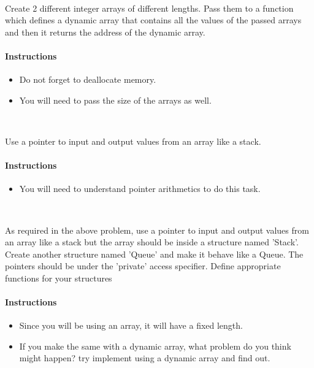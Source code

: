 \documentclass[11pt,fleqn]{book} %
\begin{document}
~\\
\begin{problem}
	Create 2 different integer arrays of different lengths.	Pass them to a function which defines a dynamic array that contains all the values of the passed arrays and then it returns the address of the dynamic array.\\
	\paragraph{Instructions}
	\begin{itemize}
		\item Do not forget to deallocate memory.
		\item You will need to pass the size of the arrays as well.
	\end{itemize}
\end{problem}
~\\
\newpage
\begin{problem}
	Use a pointer to input and output values from an array like a stack.\\
	\paragraph{Instructions}
	\begin{itemize}
		\item You will need to understand pointer arithmetics to do this task.
	\end{itemize}
\end{problem}
~\\

\begin{problem}
	As required in the above problem, use a pointer to input and output values from an array like a stack but the array should be inside a structure named 'Stack'. Create another structure named 'Queue' and make it behave like a Queue. The pointers should be under the 'private' access specifier. Define appropriate functions for your structures\\
	\paragraph{Instructions}
	\begin{itemize}
		\item Since you will be using an array, it will have a fixed length.
		\item If you make the same with a dynamic array, what problem do you think might happen? try implement using a dynamic array and find out.
	\end{itemize}
\end{problem}
\end{document}
